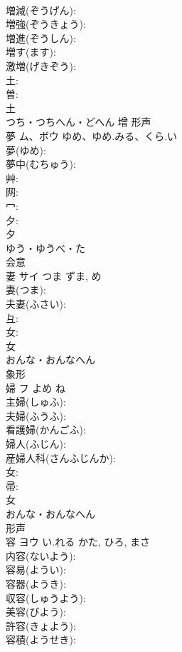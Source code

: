 \documentclass[8pt]{extreport}
\begin{document}
\begin{CJK}{UTF8}{min}
\\	増減(ぞうげん): 
\\	増強(ぞうきょう): 
\\	増進(ぞうしん): 
\\	増す(ます): 
\\	激増(げきぞう): 
\\	土: 
\\	曽: 
\\	土	
\\	つち・つちへん・どへん	增	形声 
\\	夢	ム、ボウ	ゆめ、ゆめ.みる、くら.い		
\\	夢(ゆめ): 
\\	夢中(むちゅう): 
\\	艸: 
\\	网: 
\\	冖: 
\\	夕: 
\\	夕	
\\	ゆう・ゆうべ・た	
\\	会意 
\\	妻	サイ	つま	ずま, め	
\\	妻(つま): 
\\	夫妻(ふさい): 
\\	彑: 
\\	女: 
\\	女	
\\	おんな・おんなへん	
\\	象形 
\\	婦	フ	よめ	ね	
\\	主婦(しゅふ): 
\\	夫婦(ふうふ): 
\\	看護婦(かんごふ): 
\\	婦人(ふじん): 
\\	産婦人科(さんふじんか): 
\\	女: 
\\	帚: 
\\	女	
\\	おんな・おんなへん	
\\	形声 
\\	容	ヨウ	い.れる	かた, ひろ, まさ	
\\	内容(ないよう): 
\\	容易(ようい): 
\\	容器(ようき): 
\\	収容(しゅうよう): 
\\	美容(びよう): 
\\	許容(きょよう): 
\\	容積(ようせき): 

\end{CJK}
\end{document}
